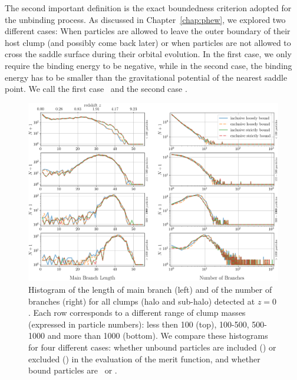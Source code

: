 The second important definition is the exact boundedness criterion
adopted for the unbinding process.  As discussed in
Chapter~\ref{chap:phew}, we explored two different cases: When
particles are allowed to leave the outer boundary of their host clump
(and possibly come back later) or when particles are not allowed to
cross the saddle surface during their orbital evolution. In the first
case, we only require the binding energy to be negative, while in the
second case, the binding energy has to be smaller than the
gravitational potential of the nearest saddle point.  We call the
first case \nosad\ and the second case \sad.

\begin{figure}
  \centering
  \includegraphics[width=\textwidth,keepaspectratio]
	{figures/ACACIA/tree-statistics-my-threshold/tree_geometry-inc-excl.png}
  \caption{Histogram of the length of main branch (left) and of the
    number of branches (right) for all clumps (halo and sub-halo)
    detected at $z=0$. Each row corresponds to a different range of
    clump masses (expressed in particle numbers): less then 100 (top),
    100-500, 500-1000 and more than 1000 (bottom). We compare these
    histograms for four different cases: whether unbound particles are
    included (\inc) or excluded (\exc) in the evaluation of the merit
    function, and whether bound particles are \nosad\ or \sad.
  }%
  \label{fig:saddle_nosaddle_mbl_nbranch}
\end{figure}

